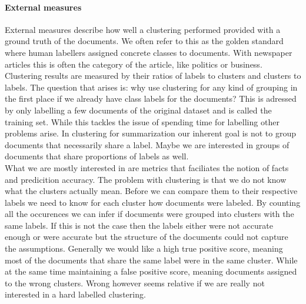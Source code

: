     \paragraph{External measures}
      External measures describe how well a clustering performed provided with a ground truth of the documents. We often refer to this as the golden standard where human labellers assigned concrete classes to documents. With newspaper articles this is often the category of the article, like politics or business. Clustering results are measured by their ratios of labels to clusters and clusters to labels. The question that arises is: why use clustering for any kind of grouping in the first place if we already have class labels for the documents? This is adressed by only labelling a few documents of the original dataset and is called the training set. While this tackles the issue of spending time for labelling other problems arise. In clustering for summarization our inherent goal is not to group documents that necessarily share a label. Maybe we are interested in groups of documents that share proportions of labels as well.\\
      What we are mostly interested in are metrics that faciliates the notion of facts and predicition accuracy. The problem with clustering is that we do not know what the clusters actually mean. Before we can compare them to their respective labels we need to know for each cluster how documents were labeled. By counting all the occurences we can infer if documents were grouped into clusters with the same labels. If this is not the case then the labels either were not accurate enough or were accurate but the structure of the documents could not capture the assumptions. Generally we would like a high true positive score, meaning most of the documents that share the same label were in the same cluster. While at the same time maintaining a false positive score, meaning documents assigned to the wrong clusters. Wrong however seems relative if we are really not interested in a hard labelled clustering.

